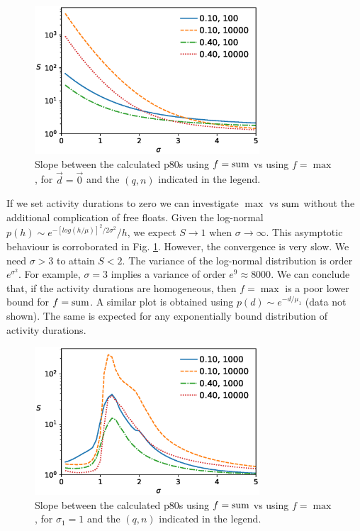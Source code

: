 \documentclass[reprint,aps,prl,amsmath,amssymb,superscriptaddress,showpacs]{revtex4-1}
\begin{document}
\begin{figure}[t]
\includegraphics[width=3.3in]{maxsum.scheduling.dupsplit.arc_distribution_zero.eps}
\caption{Slope between the calculated p80s using $f={\rm sum}$ vs using $f={\max}$, for $\vec{d}=\vec{0}$ and the $(q,n)$ indicated in the legend.}
\label{fig1}
\end{figure}

If we set activity durations to zero we can investigate $\max$ vs ${\rm sum}$ without the additional complication of free floats. Given the log-normal $p(h)\sim e^{-[log(h/\mu)]^2/2\sigma^2}/h$, we expect $S\rightarrow1$ when $\sigma\rightarrow\infty$. This asymptotic behaviour is corroborated in Fig. \ref{fig1}. However, the convergence is very slow. We need $\sigma>3$ to attain $S<2$. The variance of the log-normal distribution is order $e^{\sigma^2}$. For example, $\sigma=3$ implies a variance of order $e^9\approx 8000$. We can conclude that, if the activity durations are homogeneous, then $f=\max$ is a poor lower bound for $f={\rm sum}$. A similar plot is obtained using $p(d)\sim e^{-d/\mu_1}$ (data not shown). The same is expected for any exponentially bound distribution of activity durations.

\begin{figure}[t]
\includegraphics[width=3.3in]{maxsum.scheduling.dupsplit.arc_distribution_lognormal.arc_sigma_1.eps}
\caption{Slope between the calculated p80s using $f={\rm sum}$ vs using $f={\max}$, for $\sigma_1=1$ and the $(q,n)$ indicated in the legend. }
\label{fig2}
\end{figure}
\end{document}
